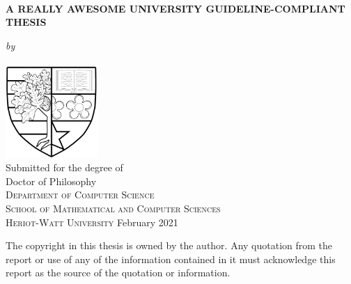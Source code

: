 \documentclass[a4paper,12pt]{report}
\date{\today}
\newcommand{\auth}{Your Name}
\newcommand{\thesistitle}{A Really Awesome University Guideline-Compliant Thesis}
\newcommand{\degree}{Doctor of Philosophy}
\newcommand{\supdate}{February 2021}
\begin{document}
\doublespacing

\pagestyle{empty}
\begin{center}
\begin{spacing}{2}
{\large{\ \\  \vspace{1.5cm}\textbf{\MakeUppercase{\thesistitle}}}}\\
\end{spacing}
\vfill
{\Large\textit{by}}\\\vspace{0.2cm}
{\Large\upshape{\auth}}\\\vspace{1.0cm}
\includegraphics[width=3.5cm]{Figures/LogoBlack.jpg}\\
\vspace{1cm}
{\large Submitted for the degree of \\ \degree}\\
\vspace{1cm}
{\large\textsc{Department of Computer Science}\\
\textsc{School of Mathematical and Computer Sciences}\\
\textsc{Heriot-Watt University}}\vfill
{\large{\supdate}}
\end{center}
{\small The copyright in this thesis is owned by the author. Any quotation from the report or use of any of the information contained in it must acknowledge this report as the source of the quotation or information.}
\clearpage


\clearpage
\pagestyle{plain}
\clearpage{}

\tableofcontents
\listoftables
\listoffigures
\printglossaries
\clearpage
\pagestyle{fancy}
\fancyhead{}
\lhead{\slshape \leftmark} 
\cfoot{\thepage}
\renewcommand{\headrulewidth}{0.4pt}
\renewcommand{\footrulewidth}{0.0pt}
\renewcommand{\chaptermark}[1]{\markboth{\chaptername\ \thechapter:\ #1}{}}








\appendix
\renewcommand{\chaptermark}[1]{\markboth{Appendix \thechapter.\ #1}{}}




\end{document}

